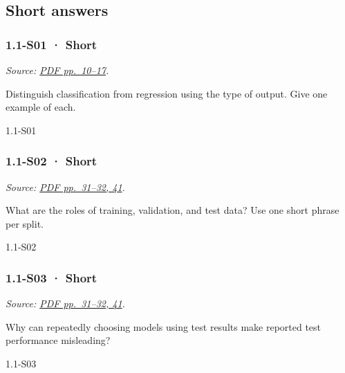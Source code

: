 \subsection{Short answers}\label{short-answers}

\noindent\begin{minipage}{\linewidth}

\subsubsection{1.1-S01 · Short}\label{s01-short}

\emph{Source:
\href{../Lecture\%20Slides/1.1.\%20Fundamentals.pdf\#page=10}{PDF
pp.~10--17}.}

Distinguish classification from regression using the type of output.
Give one example of each.

\begin{solution}[20mm]{1.1-S01}

\end{solution}
\end{minipage}\par\medskip

\noindent\begin{minipage}{\linewidth}

\subsubsection{1.1-S02 · Short}\label{s02-short}

\emph{Source:
\href{../Lecture\%20Slides/1.1.\%20Fundamentals.pdf\#page=31}{PDF
pp.~31--32, 41}.}

What are the roles of training, validation, and test data? Use one short
phrase per split.

\begin{solution}[20mm]{1.1-S02}

\end{solution}
\end{minipage}\par\medskip

\noindent\begin{minipage}{\linewidth}

\subsubsection{1.1-S03 · Short}\label{s03-short}

\emph{Source:
\href{../Lecture\%20Slides/1.1.\%20Fundamentals.pdf\#page=31}{PDF
pp.~31--32, 41}.}

Why can repeatedly choosing models using test results make reported test
performance misleading?

\begin{solution}[20mm]{1.1-S03}

\end{solution}
\end{minipage}\par\medskip

